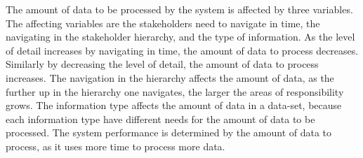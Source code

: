 The amount of data to be processed by the system is affected by three 
variables. The affecting variables are the stakeholders need to navigate in 
time, the navigating in the stakeholder hierarchy, and the type of information.
As the level of detail increases by navigating in time, the amount of data to 
process decreases. Similarly by decreasing the level of detail, the amount of 
data to process increases. The navigation in the hierarchy affects the amount 
of data, as the further up in the hierarchy one navigates, the larger the 
areas of responsibility grows. The information type affects the amount of data 
in a data-set, because each information type have different needs for the 
amount of data to be processed. The system performance is determined by the 
amount of data to process, as it uses more time to process more data. 



